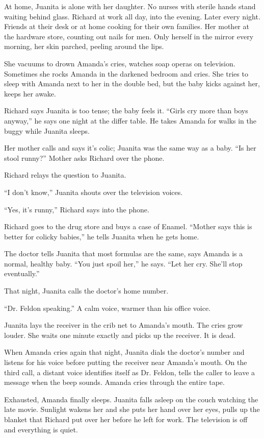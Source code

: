 \documentclass[
]{article}
\begin{document}
At home, Juanita is alone with her daughter. No nurses with sterile
hands stand waiting behind glass. Richard at work all day, into the
evening. Later every night. Friends at their desk or at home cooking for
their own families. Her mother at the hardware store, counting out nails
for men. Only herself in the mirror every morning, her skin parched,
peeling around the lips.

She vacuums to drown Amanda's cries, watches soap operas on television.
Sometimes she rocks Amanda in the darkened bedroom and cries. She tries
to sleep with Amanda next to her in the double bed, but the baby kicks
against her, keeps her awake.

Richard says Juanita is too tense; the baby feels it. ``Girls cry more
than boys anyway,'' he says one night at the differ table. He takes
Amanda for walks in the buggy while Juanita sleeps.

Her mother calls and says it's colic; Juanita was the same way as a
baby. ``Is her stool runny?'' Mother asks Richard over the phone.

Richard relays the question to Juanita.

``I don't know,'' Juanita shouts over the television voices.

``Yes, it's runny,'' Richard says into the phone.

Richard goes to the drug store and buys a case of Enamel. ``Mother says
this is better for colicky babies,'' he tells Juanita when he gets home.

The doctor tells Juanita that most formulas are the same, says Amanda is
a normal, healthy baby. ``You just spoil her,'' he says. ``Let her cry.
She'll stop eventually.''

That night, Juanita calls the doctor's home number.

``Dr. Feldon speaking.'' A calm voice, warmer than his office voice.

Juanita lays the receiver in the crib net to Amanda's mouth. The cries
grow louder. She waits one minute exactly and picks up the receiver. It
is dead.

When Amanda cries again that night, Juanita dials the doctor's number
and listens for his voice before putting the receiver near Amanda's
mouth. On the third call, a distant voice identifies itself as Dr.
Feldon, tells the caller to leave a message when the beep sounds. Amanda
cries through the entire tape.

Exhausted, Amanda finally sleeps. Juanita falls asleep on the couch
watching the late movie. Sunlight wakens her and she puts her hand over
her eyes, pulls up the blanket that Richard put over her before he left
for work. The television is off and everything is quiet.
\end{document}
